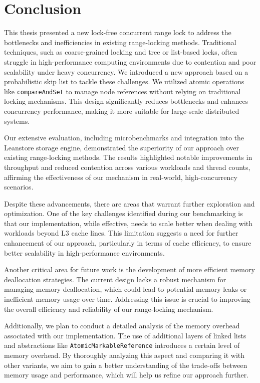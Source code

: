 \chapter{Conclusion}\label{chapter}

This thesis presented a new lock-free concurrent range lock to address the bottlenecks and inefficiencies in existing range-locking methods. Traditional techniques, such as coarse-grained locking and tree or list-based locks, often struggle in high-performance computing environments due to contention and poor scalability under heavy concurrency. We introduced a new approach based on a probabilistic skip list to tackle these challenges. We utilized atomic operations like \texttt{compareAndSet} to manage node references without relying on traditional locking mechanisms. This design significantly reduces bottlenecks and enhances concurrency performance, making it more suitable for large-scale distributed systems.

Our extensive evaluation, including microbenchmarks and integration into the Leanstore storage engine, demonstrated the superiority of our approach over existing range-locking methods. The results highlighted notable improvements in throughput and reduced contention across various workloads and thread counts, affirming the effectiveness of our mechanism in real-world, high-concurrency scenarios.

Despite these advancements, there are areas that warrant further exploration and optimization. One of the key challenges identified during our benchmarking is that our implementation, while effective, needs to scale better when dealing with workloads beyond L3 cache lines. This limitation suggests a need for further enhancement of our approach, particularly in terms of cache efficiency, to ensure better scalability in high-performance environments.

Another critical area for future work is the development of more efficient memory deallocation strategies. The current design lacks a robust mechanism for managing memory deallocation, which could lead to potential memory leaks or inefficient memory usage over time. Addressing this issue is crucial to improving the overall efficiency and reliability of our range-locking mechanism.

Additionally, we plan to conduct a detailed analysis of the memory overhead associated with our implementation. The use of additional layers of linked lists and abstractions like \texttt{AtomicMarkableReference} introduces a certain level of memory overhead. By thoroughly analyzing this aspect and comparing it with other variants, we aim to gain a better understanding of the trade-offs between memory usage and performance, which will help us refine our approach further.

